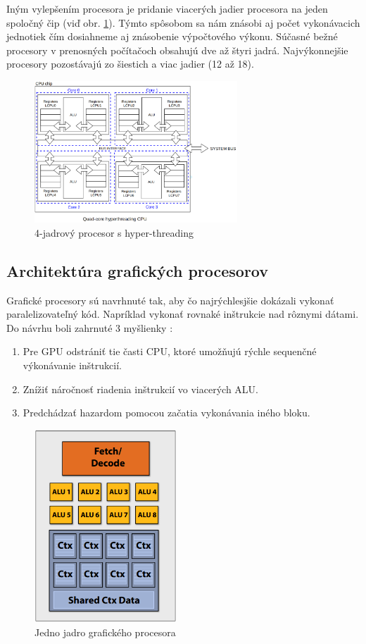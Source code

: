 \documentclass[conference]{IEEEtran}
\begin{document}
Iným vylepšením procesora je pridanie viacerých jadier procesora na jeden spoločný čip (viď obr. \ref{quad}\cite{picture}). Týmto spôsobom sa nám znásobi aj počet vykonávacich jednotiek 
čím dosiahneme aj znásobenie výpočtového výkonu. Súčasné bežné procesory v prenosných počítačoch obsahujú dve až štyri jadrá. Najvýkonnejšie procesory pozostávajú zo šiestich a viac jadier (12 až 18).  

\begin{figure}[!h]
\centering
\includegraphics[width=3in]{img/quad}
\caption{4-jadrový procesor s hyper-threading \label{quad}}
\end{figure}

\subsection{Architektúra grafických procesorov}

Grafické procesory sú navrhnuté tak, aby čo najrýchlesjšie dokázali vykonať paralelizovateľný kód. Napríklad vykonať rovnaké inštrukcie nad rôznymi dátami. Do návrhu boli zahrnuté 3 myšlienky \cite{GPU2011Fatahalian}: 

\begin{enumerate}
	\item{Pre GPU odstrániť tie časti CPU, ktoré umožňujú rýchle sequenčné výkonávanie inštrukcií.}\\
	\item{Znížiť náročnosť riadenia inštrukcií vo viacerých ALU.}\\
	\item{Predchádzať hazardom pomocou začatia vykonávania iného bloku.}
\end{enumerate}

\begin{figure}[!h]
\centering
\includegraphics[width=2.1in]{img/GPU-core}
\caption{Jedno jadro grafického procesora \label{core}}
\end{figure}
\end{document}
